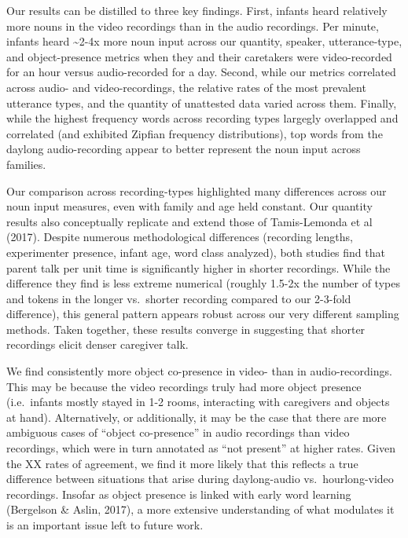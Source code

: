 \documentclass[floatsintext,man]{apa6}
\theoremstyle{definition}
\theoremstyle{definition}
\theoremstyle{definition}
\theoremstyle{remark}
\begin{document}
Our results can be distilled to three key findings. First, infants heard
relatively more nouns in the video recordings than in the audio
recordings. Per minute, infants heard \textasciitilde{}2-4x more noun
input across our quantity, speaker, utterance-type, and object-presence
metrics when they and their caretakers were video-recorded for an hour
versus audio-recorded for a day. Second, while our metrics correlated
across audio- and video-recordings, the relative rates of the most
prevalent utterance types, and the quantity of unattested data varied
across them. Finally, while the highest frequency words across recording
types largegly overlapped and correlated (and exhibited Zipfian
frequency distributions), top words from the daylong audio-recording
appear to better represent the noun input across families.

Our comparison across recording-types highlighted many differences
across our noun input measures, even with family and age held constant.
Our quantity results also conceptually replicate and extend those of
Tamis-Lemonda et al (2017). Despite numerous methodological differences
(recording lengths, experimenter presence, infant age, word class
analyzed), both studies find that parent talk per unit time is
significantly higher in shorter recordings. While the difference they
find is less extreme numerical (roughly 1.5-2x the number of types and
tokens in the longer vs.~shorter recording compared to our 2-3-fold
difference), this general pattern appears robust across our very
different sampling methods. Taken together, these results converge in
suggesting that shorter recordings elicit denser caregiver talk.

We find consistently more object co-presence in video- than in
audio-recordings. This may be because the video recordings truly had
more object presence (i.e.~infants mostly stayed in 1-2 rooms,
interacting with caregivers and objects at hand). Alternatively, or
additionally, it may be the case that there are more ambiguous cases of
\enquote{object co-presence} in audio recordings than video recordings,
which were in turn annotated as \enquote{not present} at higher rates.
Given the XX rates of agreement, we find it more likely that this
reflects a true difference between situations that arise during
daylong-audio vs.~hourlong-video recordings. Insofar as object presence
is linked with early word learning (Bergelson \& Aslin, 2017), a more
extensive understanding of what modulates it is an important issue left
to future work.
\end{document}
